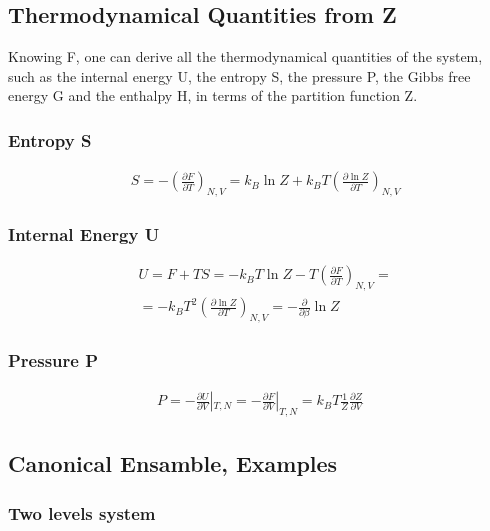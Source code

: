 \documentclass{article}
\begin{document}
\subsection{Thermodynamical Quantities from Z}

Knowing F, one can derive all the thermodynamical quantities of the system, such as the internal energy U, the entropy S, the pressure P, the Gibbs free energy G and the enthalpy H, in terms of the partition function Z.

\subsubsection{Entropy S}

\begin{align*}
     & S = -\left( \frac{\partial F}{\partial T} \right)_{N,V} = k_B \ln{Z} + k_B T \left( \frac{\partial \ln{Z}}{\partial T} \right)_{N,V}
\end{align*}

\subsubsection{Internal Energy U}

\begin{align*}
     & U= F+TS= -k_B T \ln{Z}-T\left( \frac{\partial F}{\partial T} \right)_{N,V}=                                 \\
     & = -k_B T^2 \left( \frac{\partial \ln{Z}}{\partial T} \right)_{N,V}= -\frac{\partial}{\partial \beta} \ln{Z}
\end{align*}

\subsubsection{Pressure P}

\begin{align*}
    P=-\frac{\partial U}{\partial V}|_{T,N}=-\frac{\partial F}{\partial V}|_{T,N}=k_B T \frac{1}{Z}\frac{\partial Z}{\partial V}
\end{align*}

\newpage
\subsection{Canonical Ensamble, Examples}

\subsubsection{Two levels system}
\end{document}
